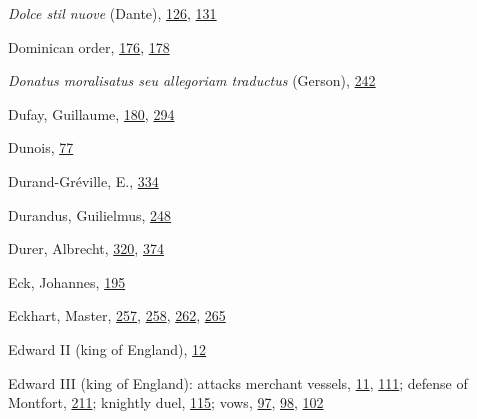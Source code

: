 \emph{Dolce stil nuove} (Dante),
\protect\hyperlink{11_Chapter_Four__THE_FORMS_OF_LOVE.xhtmlux5cux23page_126}{126},
\protect\hyperlink{11_Chapter_Four__THE_FORMS_OF_LOVE.xhtmlux5cux23page_131}{131}

Dominican order,
\protect\hyperlink{13_Chapter_Six__THE_DEPICTION_OF_TH.xhtmlux5cux23page_176}{176},
\protect\hyperlink{13_Chapter_Six__THE_DEPICTION_OF_TH.xhtmlux5cux23page_178}{178}

\emph{Donatus moralisatus seu allegoriam traductus} (Gerson),
\protect\hyperlink{16_Chapter_Nine__THE_DECLINE_OF_SYM.xhtmlux5cux23page_242}{242}

Dufay, Guillaume,
\protect\hyperlink{13_Chapter_Six__THE_DEPICTION_OF_TH.xhtmlux5cux23page_180}{180},
\protect\hyperlink{19_Chapter_Twelve__ART_IN_LIFE.xhtmlux5cux23page_294}{294}

Dunois,
\protect\hyperlink{10_Chapter_Three__THE_HEROIC_DREAM.xhtmlux5cux23page_77}{77}

Durand-Gréville, E.,
\protect\hyperlink{21_Chapter_Thirteen__IMAGE_AND_WORD.xhtmlux5cux23page_334}{334}

Durandus, Guilielmus,
\protect\hyperlink{16_Chapter_Nine__THE_DECLINE_OF_SYM.xhtmlux5cux23page_248}{248}

Durer, Albrecht,
\protect\hyperlink{20_ILLUSTRATIONS_FOLLOW_PAGE.xhtmlux5cux23page_320}{320},
\protect\hyperlink{21_Chapter_Thirteen__IMAGE_AND_WORD.xhtmlux5cux23page_374}{374}

Eck, Johannes,
\protect\hyperlink{13_Chapter_Six__THE_DEPICTION_OF_TH.xhtmlux5cux23page_195}{195}

Eckhart, Master,
\protect\hyperlink{17_Chapter_Ten__THE_FAILURE_OF_IMAG.xhtmlux5cux23page_257}{257},
\protect\hyperlink{17_Chapter_Ten__THE_FAILURE_OF_IMAG.xhtmlux5cux23page_258}{258},
\protect\hyperlink{17_Chapter_Ten__THE_FAILURE_OF_IMAG.xhtmlux5cux23page_262}{262},
\protect\hyperlink{17_Chapter_Ten__THE_FAILURE_OF_IMAG.xhtmlux5cux23page_265}{265}

Edward II (king of England),
\protect\hyperlink{08_Chapter_One__THE_PASSIONATE_INTE.xhtmlux5cux23page_12}{12}

Edward III (king of England): attacks merchant vessels,
\protect\hyperlink{08_Chapter_One__THE_PASSIONATE_INTE.xhtmlux5cux23page_11}{11},
\protect\hyperlink{10_Chapter_Three__THE_HEROIC_DREAM.xhtmlux5cux23page_111}{111};
defense of Montfort,
\protect\hyperlink{14_Chapter_Seven__THE_PIOUS_PERSONA.xhtmlux5cux23page_211}{211};
knightly duel,
\protect\hyperlink{10_Chapter_Three__THE_HEROIC_DREAM.xhtmlux5cux23page_115}{115};
vows,
\protect\hyperlink{10_Chapter_Three__THE_HEROIC_DREAM.xhtmlux5cux23page_97}{97},
\protect\hyperlink{10_Chapter_Three__THE_HEROIC_DREAM.xhtmlux5cux23page_98}{98},
\protect\hyperlink{10_Chapter_Three__THE_HEROIC_DREAM.xhtmlux5cux23page_102}{102}

